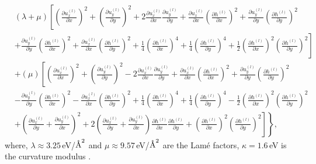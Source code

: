 \documentclass[aps,prx,10pt,twocolumn,superscriptaddress]{revtex4}
\def\angstrom{\mbox{\normalfont\AA}}
\def\angstrom{\mbox{\normalfont\AA}}
\begin{document}
\begin{widetext}
\begin{align}
&(\lambda+\mu)\left[ \left(\frac{\partial u^{(l)}_{x}}{\partial x}\right)^{2}+\left(\frac{\partial u^{(l)}_{y}}{\partial y}\right)^{2}+2\frac{\partial u^{(l)}_{x}}{\partial x}\frac{\partial u^{(l)}_{y}}{\partial y}+\frac{\partial u^{(l)}_{x}}{\partial x}\left(\frac{\partial h^{(l)}}{\partial x}\right)^{2}+\frac{\partial u^{(l)}_{y}}{\partial y}\left(\frac{\partial h^{(l)}}{\partial y}\right)^{2} \right. \nonumber\\
&\left.+\frac{\partial u^{(l)}_{y}}{\partial y}\left(\frac{\partial h^{(l)}}{\partial x}\right)^{2}+\frac{\partial u^{(l)}_{x}}{\partial x}\left(\frac{\partial h^{(l)}}{\partial y}\right)^{2}+\frac{1}{4}\left(\frac{\partial h^{(l)}}{\partial x}\right)^{4}+\frac{1}{4}\left(\frac{\partial h^{(l)}}{\partial y}\right)^{4}+\frac{1}{2}\left(\frac{\partial h^{(l)}}{\partial x}\right)^{2}\left(\frac{\partial h^{(l)}}{\partial y}\right)^{2}\right]\nonumber\\
&+(\mu)\left[ \left(\frac{\partial u^{(l)}_{x}}{\partial x}\right)^{2}+\left(\frac{\partial u^{(l)}_{y}}{\partial y}\right)^{2}-2\frac{\partial u^{(l)}_{x}}{\partial x}\frac{\partial u^{(l)}_{y}}{\partial y}+\frac{\partial u^{(l)}_{x}}{\partial x}\left(\frac{\partial h^{(l)}}{\partial x}\right)^{2}+\frac{\partial u^{(l)}_{y}}{\partial y}\left(\frac{\partial h^{(l)}}{\partial y}\right)^{2} \right.\nonumber\\
&-\frac{\partial u^{(l)}_{y}}{\partial y}\left(\frac{\partial h^{(l)}}{\partial x}\right)^{2}-\frac{\partial u^{(l)}_{x}}{\partial x}\left(\frac{\partial h^{(l)}}{\partial y}\right)^{2}+\frac{1}{4}\left(\frac{\partial h^{(l)}}{\partial x}\right)^{4}+\frac{1}{4}\left(\frac{\partial h^{(l)}}{\partial y}\right)^{4}-\frac{1}{2}\left(\frac{\partial h^{(l)}}{\partial x}\right)^{2}\left(\frac{\partial h^{(l)}}{\partial y}\right)^{2}\nonumber\\
&\left.\left. +\left(\frac{\partial u^{(l)}_{x}}{\partial y}+\frac{\partial u^{(l)}_{y}}{\partial x}\right)^{2}+2\left(\frac{\partial u^{(l)}_{x}}{\partial y}+\frac{\partial u^{(l)}_{y}}{\partial x}\right)\frac{\partial h^{(l)}}{\partial x}\frac{\partial h^{(l)}}{\partial y}+\left(\frac{\partial h^{(l)}}{\partial x}\right)^{2}\left(\frac{\partial h^{(l)}}{\partial y}\right)^{2} \right]\right\},
\end{align}
where, $\lambda\approx 3.25\,$eV/$\angstrom^{2}$ and $\mu\approx 9.57\,$eV/$\angstrom^{2}$ are the Lam\'e factors, $\kappa\!=\!1.6\,$eV is the curvature modulus \cite{jung2015origin}.



\end{widetext}
\end{document}
